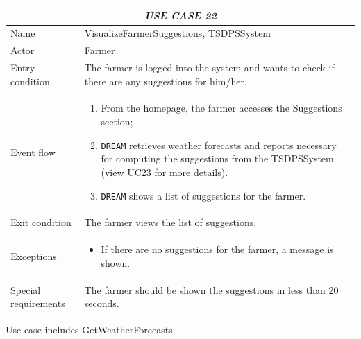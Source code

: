 \documentclass{article}
\begin{document}
\centering
\begin{longtable}{|p{3.5cm}|m{8cm}|}
 \hline
 \multicolumn{2}{|c|}{\cellcolor{white}\emph{USE CASE 22}} \\
 \endfirsthead
 \endhead
 \endfoot
 \endlastfoot
 \hline
 Name & VisualizeFarmerSuggestions, TSDPSSystem\\
 \hline
 Actor & Farmer\\
 \hline
 Entry condition & The farmer is logged into the system and wants to check if there are any suggestions for him/her.\\
 \hline
 Event flow & \begin{enumerate}
    \item From the homepage, the farmer accesses the Suggestions section;
    \item \verb|DREAM| retrieves weather forecasts and reports necessary for computing the suggestions from the TSDPSSystem (view UC23 for more details).
    \item \verb|DREAM| shows a list of suggestions for the farmer.
 \end{enumerate}\\
 \hline
 Exit condition & The farmer views the list of suggestions.\\
 \hline
 Exceptions & \begin{itemize}
     \item If there are no suggestions for the farmer, a message is shown.
 \end{itemize}\\
 \hline
 Special requirements & The farmer should be shown the suggestions in less than 20 seconds.\\
 \hline
\end{longtable}
\color{red}
Use case includes GetWeatherForecasts.
\color{black}

\end{document}
